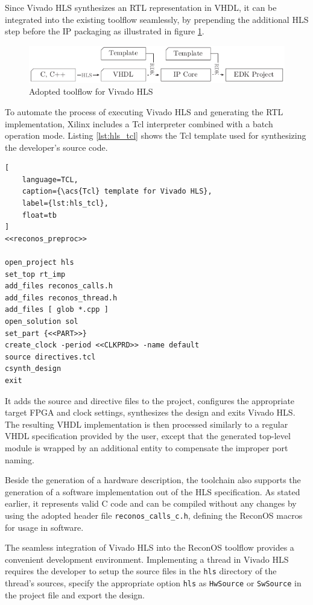 Since Vivado HLS synthesizes an \ac{RTL} representation in \ac{VHDL}, it can
be integrated into the existing toolflow seamlessly, by prepending the
additional \ac{HLS} step before the \ac{IP} packaging as illustrated in figure
\ref{fig:rdk}.
\begin{figure}
	\centering
	\includegraphics{../figures/rdk}
	\caption{Adopted toolflow for Vivado HLS}
	\label{fig:rdk}
\end{figure}
To automate the process of executing Vivado HLS and generating the \ac{RTL}
implementation, Xilinx includes a \ac{Tcl} interpreter combined with a batch
operation mode. Listing \ref{lst:hls_tcl} shows the \ac{Tcl} template used for
synthesizing the developer's source code.
\begin{lstlisting}[
	language=TCL,
	caption={\acs{Tcl} template for Vivado HLS},
	label={lst:hls_tcl},
	float=tb
]
<<reconos_preproc>>

open_project hls
set_top rt_imp
add_files reconos_calls.h
add_files reconos_thread.h
add_files [ glob *.cpp ]
open_solution sol
set_part {<<PART>>}
create_clock -period <<CLKPRD>> -name default
source directives.tcl
csynth_design
exit
\end{lstlisting}
It adds the source and directive files to the project, configures the
appropriate target \ac{FPGA} and clock settings, synthesizes the design and
exits Vivado HLS. The resulting \ac{VHDL} implementation is then processed
similarly to a regular \ac{VHDL} specification provided by the user, except
that the generated top-level module is wrapped by an additional entity to
compensate the improper port naming.

Beside the generation of a hardware description, the toolchain also
supports the generation of a software implementation out of the \ac{HLS}
specification. As stated earlier, it represents valid C code and can be
compiled without any changes by using the adopted header file
\lstinline{reconos_calls_c.h}, defining the ReconOS macros for usage in
software.

The seamless integration of Vivado HLS into the ReconOS toolflow provides a
convenient development environment. Implementing a thread in Vivado HLS
requires the developer to setup the source files in the \lstinline{hls}
directory of the thread's sources, specify the appropriate option
\lstinline{hls} as \lstinline{HwSource} or \lstinline{SwSource} in the project
file and export the design.

